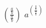 \documentclass{article}
\begin{document}
$\left(\frac{\frac{a}{b}}{\frac{a}{b}}\right)$
\qquad
$a^{\left(\frac{\frac{a}{b}}{\frac{a}{b}}\right)}$ %
\end{document}
